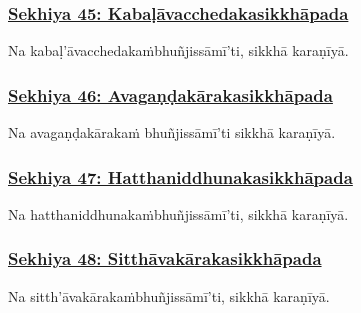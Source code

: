 \subsubsection*{\hyperref[training45]{Sekhiya 45: Kabaḷāvacchedakasikkhāpada}}
\label{sekh45}

Na kabaḷ'āvacchedakaṁ\makeatletter\hyperlink{endnote498-appendix}\makeatother \thinspace bhuñjissāmī'ti, sikkhā karaṇīyā.



\subsubsection*{\hyperref[training46]{Sekhiya 46: Avagaṇḍakārakasikkhāpada}}
\label{sekh46}

Na avagaṇḍakārakaṁ bhuñjissāmī'ti sikkhā karaṇīyā.



\subsubsection*{\hyperref[training47]{Sekhiya 47: Hatthaniddhunakasikkhāpada}}
\label{sekh47}

Na hatthaniddhunakaṁ\makeatletter\hyperlink{endnote499-appendix}\makeatother \thinspace bhuñjissāmī'ti, sikkhā karaṇīyā.



\subsubsection*{\hyperref[training48]{Sekhiya 48: Sitthāvakārakasikkhāpada}}
\label{sekh48}

Na sitth'āvakārakaṁ\makeatletter\hyperlink{endnote500-appendix}\makeatother \thinspace bhuñjissāmī'ti, sikkhā karaṇīyā.



